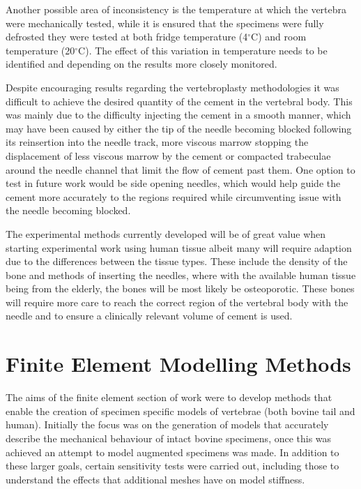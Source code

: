 Another possible area of inconsistency is the temperature at which the vertebra were mechanically tested, while it is ensured that the specimens were fully defrosted they were tested at both fridge temperature (4$^\circ$C) and room temperature (20$^\circ$C). The effect of this variation in temperature needs to be identified and depending on the results more closely monitored.

Despite encouraging results regarding the vertebroplasty methodologies it was difficult to achieve the desired quantity of the cement in the vertebral body. This was mainly due to the difficulty injecting the cement in a smooth manner, which may have been caused by either the tip of the needle becoming blocked following its reinsertion into the needle track, more viscous marrow stopping the displacement of less viscous marrow by the cement or compacted trabeculae around the needle channel that limit the flow of cement past them. One option to test in future work would be side opening needles, which would help guide the cement more accurately to the regions required while circumventing issue with the needle becoming blocked.

The experimental methods currently developed will be of great value when starting experimental work using human tissue albeit many will require adaption due to the differences between the tissue types. These include the density of the bone and methods of inserting the needles, where with the available human tissue being from the elderly, the bones will be most likely be osteoporotic. These bones will require more care to reach the correct region of the vertebral body with the needle and to ensure a clinically relevant volume of cement is used.



\pagebreak

\section{Finite Element Modelling
Methods}\label{finite-element-modelling-methods}

The aims of the finite element section of work were to develop methods that enable the creation of specimen specific models of vertebrae (both bovine tail and human). Initially the focus was on the generation of models that accurately describe the mechanical behaviour of intact bovine specimens, once this was achieved an attempt to model augmented specimens was made. In addition to these larger goals, certain sensitivity tests were carried out, including those to understand the effects that additional meshes have on model stiffness.


